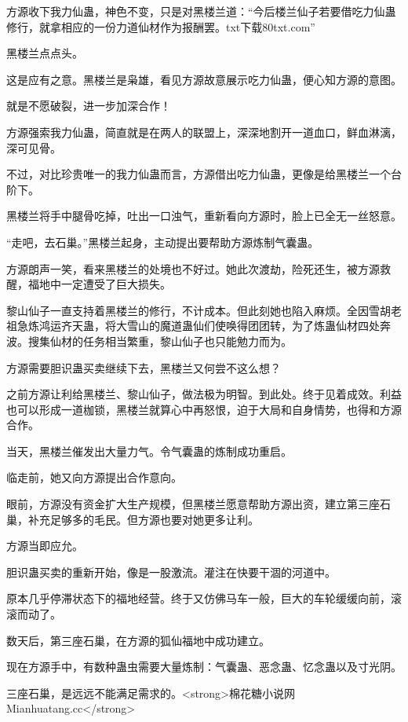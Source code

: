 
\begin{this_body}

方源收下我力仙蛊，神色不变，只是对黑楼兰道：“今后楼兰仙子若要借吃力仙蛊修行，就拿相应的一份力道仙材作为报酬罢。txt下载80txt.com”

黑楼兰点点头。

这是应有之意。黑楼兰是枭雄，看见方源故意展示吃力仙蛊，便心知方源的意图。

就是不愿破裂，进一步加深合作！

方源强索我力仙蛊，简直就是在两人的联盟上，深深地割开一道血口，鲜血淋漓，深可见骨。

不过，对比珍贵唯一的我力仙蛊而言，方源借出吃力仙蛊，更像是给黑楼兰一个台阶下。

黑楼兰将手中腿骨吃掉，吐出一口浊气，重新看向方源时，脸上已全无一丝怒意。

“走吧，去石巢。”黑楼兰起身，主动提出要帮助方源炼制气囊蛊。

方源朗声一笑，看来黑楼兰的处境也不好过。她此次渡劫，险死还生，被方源救醒，福地中一定遭受了巨大损失。

黎山仙子一直支持着黑楼兰的修行，不计成本。但此刻她也陷入麻烦。全因雪胡老祖急炼鸿运齐天蛊，将大雪山的魔道蛊仙们使唤得团团转，为了炼蛊仙材四处奔波。搜集仙材的任务相当繁重，黎山仙子也只能勉力而为。

方源需要胆识蛊买卖继续下去，黑楼兰又何尝不这么想？

之前方源让利给黑楼兰、黎山仙子，做法极为明智。到此处。终于见着成效。利益也可以形成一道枷锁，黑楼兰就算心中再怒恨，迫于大局和自身情势，也得和方源合作。

当天，黑楼兰催发出大量力气。令气囊蛊的炼制成功重启。

临走前，她又向方源提出合作意向。

眼前，方源没有资金扩大生产规模，但黑楼兰愿意帮助方源出资，建立第三座石巢，补充足够多的毛民。但方源也要对她更多让利。

方源当即应允。

胆识蛊买卖的重新开始，像是一股激流。灌注在快要干涸的河道中。

原本几乎停滞状态下的福地经营。终于又仿佛马车一般，巨大的车轮缓缓向前，滚滚而动了。

数天后，第三座石巢，在方源的狐仙福地中成功建立。

现在方源手中，有数种蛊虫需要大量炼制：气囊蛊、恶念蛊、忆念蛊以及寸光阴。

三座石巢，是远远不能满足需求的。<strong>棉花糖小说网Mianhuatang.cc</strong>


\end{this_body}
